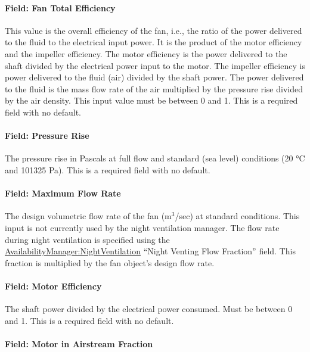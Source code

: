 \paragraph{Field: Fan Total Efficiency}\label{field-fan-total-efficiency-4}

This value is the overall efficiency of the fan, i.e., the ratio of the power delivered to the fluid to the electrical input power. It is the product of the motor efficiency and the impeller efficiency. The motor efficiency is the power delivered to the shaft divided by the electrical power input to the motor. The impeller efficiency is power delivered to the fluid (air) divided by the shaft power. The power delivered to the fluid is the mass flow rate of the air multiplied by the pressure rise divided by the air density. This input value must be between 0 and 1. This is a required field with no default.

\paragraph{Field: Pressure Rise}\label{field-pressure-rise-4}

The pressure rise in Pascals at full flow and standard (sea level) conditions (20 °C and 101325 Pa). This is a required field with no default.

\paragraph{Field: Maximum Flow Rate}\label{field-maximum-flow-rate-4}

The design volumetric flow rate of the fan (m\(^{3}\)/sec) at standard conditions. This input is not currently used by the night ventilation manager. The flow rate during night ventilation is specified using the \hyperref[availabilitymanagernightventilation]{AvailabilityManager:NightVentilation} ``Night Venting Flow Fraction'' field. This fraction is multiplied by the fan object's design flow rate.

\paragraph{Field: Motor Efficiency}\label{field-motor-efficiency-3}

The shaft power divided by the electrical power consumed. Must be between 0 and 1. This is a required field with no default.

\paragraph{Field: Motor in Airstream Fraction}\label{field-motor-in-airstream-fraction-3}

